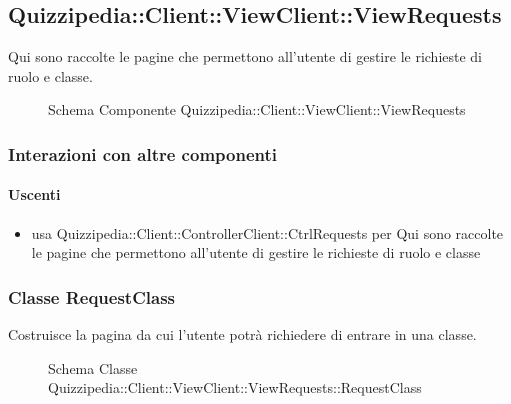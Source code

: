 \subsection{Quizzipedia::Client::ViewClient::ViewRequests}
Qui sono raccolte le pagine che permettono all'utente di gestire le richieste di ruolo e classe.
\begin{figure}[H]
\centering
\noindent{}
\caption[Schema Componente Quizzipedia::Client::ViewClient::ViewRequests]{Schema Componente Quizzipedia::Client::ViewClient::ViewRequests}
\end{figure}
\subsubsection{Interazioni con altre componenti}
\paragraph{Uscenti}
\begin{itemize}
\item usa Quizzipedia::Client::ControllerClient::CtrlRequests per Qui sono raccolte le pagine che permettono all'utente di gestire le richieste di ruolo e classe
\end{itemize}
\subsubsection{Classe RequestClass}
Costruisce la pagina da cui l'utente potrà richiedere di entrare in una classe.
\begin{figure}[H]
\centering
\noindent{}
\caption[Schema Classe RequestClass]{Schema Classe Quizzipedia::Client::ViewClient::ViewRequests::RequestClass}
\end{figure}
